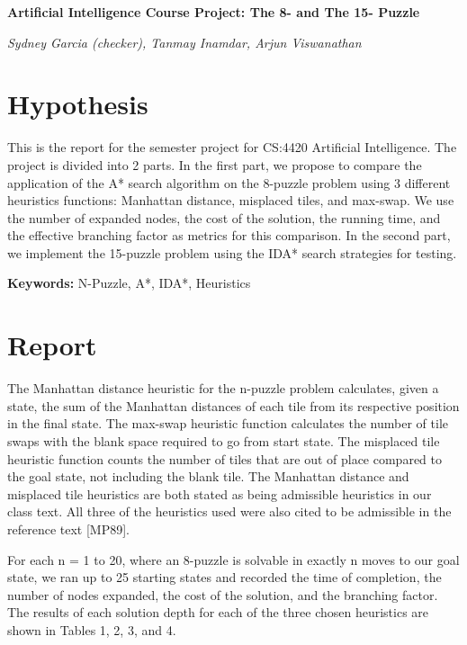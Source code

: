 \documentclass{article}
\begin{document}
	\begin{center}
		\Large \textbf{Artificial Intelligence Course Project: The 8- and The 15- Puzzle}
	\end{center}
	\begin{center}
		\textit{Sydney Garcia (checker), Tanmay Inamdar, Arjun Viswanathan}
	\end{center}

	\section{Hypothesis}
		This is the report for the semester project for CS:4420 Artificial Intelligence. The project is divided into 2 parts. In the first part, we propose to compare the application of the A* search algorithm on the 8-puzzle problem using 3 different heuristics functions: Manhattan distance, misplaced tiles, and max-swap. We use the number of expanded nodes, the cost of the solution, the running time, and the effective branching factor as metrics for this comparison. In the second part, we implement the 15-puzzle problem using the IDA* search strategies for testing. \par 
		
		\textbf{Keywords: } N-Puzzle, A*, IDA*, Heuristics
		
	\section{Report}
		
		The Manhattan distance heuristic for the n-puzzle problem calculates, given a state, the sum of the Manhattan distances of each tile from its respective position in the final state. The max-swap heuristic function calculates the number of tile swaps with the blank space required to go from start state. The misplaced tile heuristic function counts the number of tiles that are out of place compared to the goal state, not including the blank tile. The Manhattan distance and misplaced tile heuristics are both stated as being admissible heuristics in our class text. All three of the heuristics used were also cited to be admissible in the reference text [MP89]. \par
		
		For each n = 1 to 20, where an 8-puzzle is solvable in exactly n moves to our goal state, we ran up to 25 starting states and recorded the time of completion, the number of nodes expanded, the cost of the solution, and the branching factor. The results of each solution depth for each of the three chosen heuristics are shown in Tables 1, 2, 3, and 4. \par
		
\end{document}
